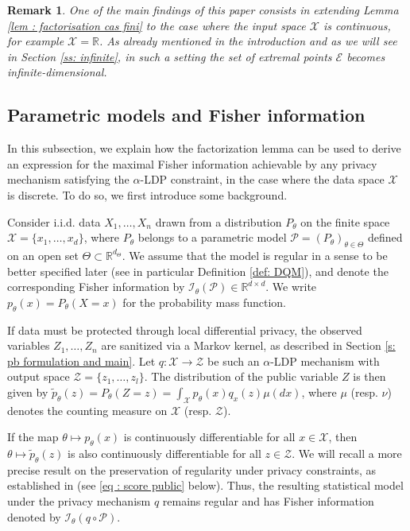 \documentclass[a4paper, 11pt]{article}
\newtheorem{rem}{Remark}
\theoremstyle{definition}
\begin{document}
{\begin{rem}
One of the main findings of this paper consists in extending Lemma \ref{lem : factorisation cas fini} to the case where the input space $\mathcal{X}$ is continuous, for example $\mathcal{X} = \mathbb{R}$. As already mentioned in the introduction and as we will see in Section \ref{ss: infinite}, in such a setting the set of extremal points $\mathcal{E}$ becomes infinite-dimensional.
\end{rem}



\subsection{Parametric models and Fisher information}\label{ss:Parametric models and Fisher information}
In this subsection, we explain how the factorization lemma can be used to derive an expression for the maximal Fisher information achievable by any privacy mechanism satisfying the $\alpha$-LDP constraint, in the case where the data space $\mathcal{X}$ is discrete. To do so, we first introduce some background.

Consider i.i.d. data $X_1, \ldots, X_n$ drawn from a distribution $P_\theta$ on the finite space $\mathcal{X} = \{x_1, \ldots, x_d\}$, where $P_\theta$ belongs to a parametric model $\mathcal{P} = (P_\theta)_{\theta \in \Theta}$ defined on an open set $\Theta \subset \mathbb{R}^{d_\Theta}$. We assume that the model is regular in a sense to be better specified later (see in particular Definition \ref{def: DQM}), and denote the corresponding Fisher information by $\mathcal{I}_\theta(\mathcal{P}) \in \mathbb{R}^{d \times d}$. We write $p_\theta(x) = P_\theta(X = x)$ for the probability mass function.

If data must be protected through local differential privacy, the observed variables $Z_1, \ldots, Z_n$ are sanitized via a Markov kernel, as described in Section \ref{s: pb formulation and main}. Let $q : \mathcal{X} \to \mathcal{Z}$ be such an $\alpha$-LDP mechanism with output space $\mathcal{Z} = \{z_1, \ldots, z_l\}$. The distribution of the public variable $Z$ is then given by $\widetilde{p}_\theta(z) = P_\theta(Z = z) = \int_{\mathcal{X}} p_\theta(x) q_x(z) \mu(dx)$, where $\mu$ (resp. $\nu$) denotes the counting measure on $\mathcal{X}$ (resp. $\mathcal{Z}$).

If the map $\theta \mapsto p_\theta(x)$ is continuously differentiable for all $x \in \mathcal{X}$, then $\theta \mapsto \widetilde{p}_\theta(z)$ is also continuously differentiable for all $z \in \mathcal{Z}$. We will recall a more precise result on the preservation of regularity under privacy constraints, as established in \cite{steinbergerEfficiencyLocalDifferent} (see \eqref{eq : score public} below). Thus, the resulting statistical model under the privacy mechanism $q$ remains regular and has Fisher information denoted by $\mathcal{I}_\theta(q \circ \mathcal{P})$.

}
\end{document}
